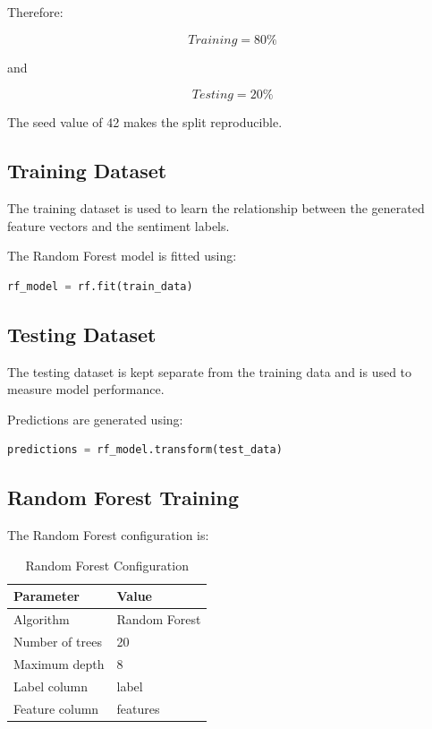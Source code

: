 \documentclass[12pt,a4paper]{article}
\begin{document}
Therefore:

\[
Training = 80\%
\]

and

\[
Testing = 20\%
\]

The seed value of 42 makes the split reproducible.

\subsection{Training Dataset}

The training dataset is used to learn the relationship between the generated feature vectors and the sentiment labels.

The Random Forest model is fitted using:

\begin{lstlisting}[language=Python]
rf_model = rf.fit(train_data)
\end{lstlisting}

\subsection{Testing Dataset}

The testing dataset is kept separate from the training data and is used to measure model performance.

Predictions are generated using:

\begin{lstlisting}[language=Python]
predictions = rf_model.transform(test_data)
\end{lstlisting}

\subsection{Random Forest Training}

The Random Forest configuration is:

\begin{table}[H]
\centering
\caption{Random Forest Configuration}
\begin{tabular}{ll}
\toprule
\textbf{Parameter} & \textbf{Value} \\
\midrule
Algorithm & Random Forest \\
Number of trees & 20 \\
Maximum depth & 8 \\
Label column & label \\
Feature column & features \\
\bottomrule
\end{tabular}
\end{table}
\end{document}
